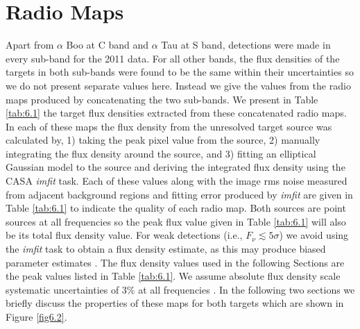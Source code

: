 \section{Radio Maps}\label{sec:6.2}
Apart from $\alpha$ Boo at C band and $\alpha$ Tau at S band, detections were made in every sub-band for the 2011 data. For all other bands, the flux densities of the targets in both sub-bands were found to be the same within their uncertainties so we do not present separate values here. Instead we give the values from the radio maps produced by concatenating the two sub-bands. We present in Table \ref{tab:6.1} the target flux densities extracted from these concatenated radio maps. In each of these maps the flux density from the unresolved target source was calculated by, 1) taking the peak pixel value from the source, 2) manually integrating the flux density around the source, and 3) fitting an elliptical Gaussian model to the source and deriving the integrated flux density using the CASA \textit{imfit} task. Each of these values along with the image rms noise measured from adjacent background regions and fitting error produced by \textit{imfit} are given in Table \ref{tab:6.1} to indicate the quality of each radio map. Both sources are point sources at all frequencies so the peak flux value given in Table \ref{tab:6.1} will also be its total flux density value. For weak detections (i.e., $F_{\nu} \lesssim 5\sigma$) we avoid using the \textit{imfit} task to obtain a flux density estimate, as this may produce biased parameter estimates \citep{taylor_1999}. The flux density values used in the following Sections are the peak values listed in Table \ref{tab:6.1}. We assume absolute flux density scale systematic uncertainties of  3\% at all frequencies \citep{perley_2013}. In the following two sections we briefly discuss the properties of these maps for both targets which are shown in Figure \ref{fig6.2}.



